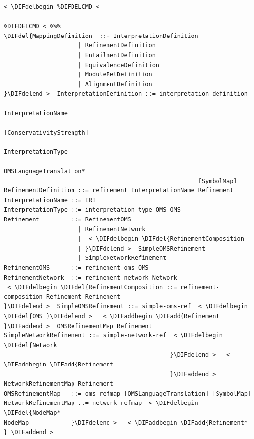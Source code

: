 \documentclass[10pt,fleqn,final]{scrreprt}
\providecommand{\DIFadd}[1]{{\protect\color{blue}\uwave{#1}}} %
\providecommand{\DIFdel}[1]{{\protect\color{red}\sout{#1}}}                      %
\providecommand{\DIFaddbegin}{} %
\providecommand{\DIFaddend}{} %
\providecommand{\DIFdelbegin}{} %
\providecommand{\DIFdelend}{} %
\begin{document}
\begin{lstlisting}[language=ebnf,escapeinside={<>},mathescape]  % abstract syntax
 < \DIFdelbegin %DIFDELCMD < 

%DIFDELCMD < %%%
\DIFdel{MappingDefinition  ::= InterpretationDefinition
                     | RefinementDefinition
                     | EntailmentDefinition
                     | EquivalenceDefinition
                     | ModuleRelDefinition
                     | AlignmentDefinition
}\DIFdelend >  InterpretationDefinition ::= interpretation-definition
                                                       InterpretationName
                                                       [ConservativityStrength]
                                                       InterpretationType
                                                       OMSLanguageTranslation*
                                                       [SymbolMap]
RefinementDefinition ::= refinement InterpretationName Refinement
InterpretationName ::= IRI
InterpretationType ::= interpretation-type OMS OMS
Refinement         ::= RefinementOMS
                     | RefinementNetwork
                     |  < \DIFdelbegin \DIFdel{RefinementComposition
                     | }\DIFdelend >  SimpleOMSRefinement
                     | SimpleNetworkRefinement
RefinementOMS      ::= refinement-oms OMS
RefinementNetwork  ::= refinement-network Network
 < \DIFdelbegin \DIFdel{RefinementComposition ::= refinement-composition Refinement Refinement
}\DIFdelend >  SimpleOMSRefinement ::= simple-oms-ref  < \DIFdelbegin \DIFdel{OMS }\DIFdelend >   < \DIFaddbegin \DIFadd{Refinement }\DIFaddend >  OMSRefinementMap Refinement
SimpleNetworkRefinement ::= simple-network-ref  < \DIFdelbegin \DIFdel{Network
                                               }\DIFdelend >   < \DIFaddbegin \DIFadd{Refinement
                                               }\DIFaddend >  NetworkRefinementMap Refinement
OMSRefinementMap   ::= oms-refmap [OMSLanguageTranslation] [SymbolMap]
NetworkRefinementMap ::= network-refmap  < \DIFdelbegin \DIFdel{NodeMap*
NodeMap            }\DIFdelend >   < \DIFaddbegin \DIFadd{Refinement*
} \DIFaddend >
\end{lstlisting}
\end{document}
